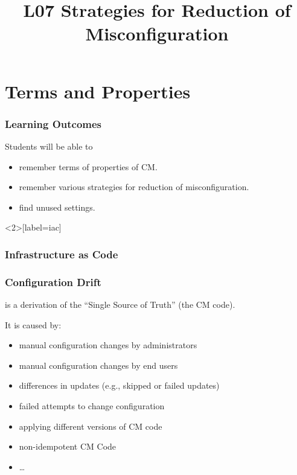 

\title{L07 Strategies for Reduction of Misconfiguration}




\section{Terms and Properties}

\begin{frame}
	\frametitle{Learning Outcomes}
	Students will be able to
	\begin{itemize}
	\item remember terms of properties of CM.
	\item remember various strategies for reduction of misconfiguration.
	\item find unused settings.
	\end{itemize}
\end{frame}

\begin{frame}<2>[label=iac]
	\frametitle{Infrastructure as Code}

\end{frame}

\begin{frame}
	\frametitle{Configuration Drift}

	is a derivation of the ``Single Source of Truth'' (the CM code).

	\vspace{1em}
	It is caused by:

	\pause

	\begin{itemize}[<+-| alert@+>]
	\item manual configuration changes by administrators
	\item manual configuration changes by end users
	\item differences in updates (e.g., skipped or failed updates)
	\item failed attempts to change configuration
	\item applying different versions of CM code
	\item non-idempotent CM Code
	\item \dots
	\end{itemize}
\end{frame}

